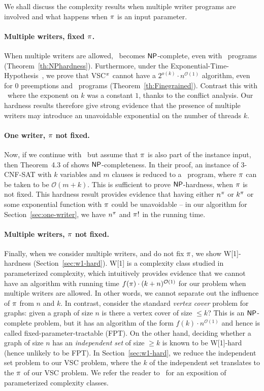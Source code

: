 We shall discuss the complexity results when multiple writer programs are involved and what happens when $\pi$ is an input parameter. 

\paragraph*{Multiple writers, fixed $\pi$.} When multiple writers are allowed, \vscp\ becomes $\mathsf{NP}$-complete, even with \twowriter\ programs (Theorem~\ref{th:NPhardness}). Furthermore, under the Exponential-Time-Hypothesis~\cite{ImpagliazzoPZ01}, we prove that VSC$^\pi$ cannot have a $2^{o(k)} \cdot n^{\mathcal{O}(1)}$ algorithm, even for $0$ preemptions and \threewriter\ programs (Theorem~\ref{th:Finegrained}). Contrast this with \onewriter\ where the exponent on $k$ was a constant $1$, thanks to the conflict analysis. Our hardness results therefore give strong evidence that the presence of multiple writers may introduce an unavoidable exponential on the number of threads $k$. 

\paragraph*{One writer, $\pi$ not fixed.} Now, if we continue with \onewriter\ but assume that $\pi$ is also part of the instance input, then Theorem~4.3 of \cite{gibbons} shows $\mathsf{NP}$-completeness. In their proof, an instance of 3-CNF-SAT with $k$ variables and $m$ clauses is reduced to a \onewriter\ program, where $\pi$ can be taken to be $\mathcal{O}(m + k)$. This is sufficient to prove $\mathsf{NP}$-hardness, when $\pi$ is not fixed. This hardness result provides evidence that having either $n^\pi$ or $k^\pi$ or some exponential function with $\pi$ could be unavoidable -- in our algorithm for Section~\ref{sec:one-writer}, we have $n^\pi$ and $\pi!$ in the running time. 

\paragraph*{Multiple writers, $\pi$ not fixed.} Finally, when we consider multiple writers, and do not fix $\pi$, we show W[1]-hardness (Section~\ref{sec:w1-hard}). W[1] is a complexity class studied in parameterized complexity, which intuitively provides evidence that we cannot have an algorithm with running time $f(\pi) \cdot (k + n)^{\mathcal{O}(1)}$ for our problem when multiple writers are allowed. In other words, we cannot separate out the influence of $\pi$ from $n$ and $k$. In contrast, consider the standard \emph{vertex cover} problem for graphs: given a graph of size $n$ is there a vertex cover of size $\le k$? This is an $\mathsf{NP}$-complete problem, but it has an algorithm of the form $f(k) \cdot n^{\mathcal{O}(1)}$ and hence is called fixed-parameter-tractable (FPT). On the other hand, deciding whether a graph of size $n$ has an \emph{independent set} of size $\ge k$ is known to be W[1]-hard (hence unlikely to be FPT). In Section~\ref{sec:w1-hard}, we reduce the independent set problem to our VSC problem, where the $k$ of the independent set translates to the $\pi$ of our VSC problem. We refer the reader to~\cite{DowneyFellows1999} for an exposition of parameterized complexity classes.

